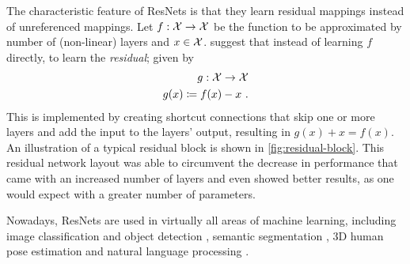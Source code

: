 The characteristic feature of ResNets is that they learn residual mappings instead of unreferenced mappings.
Let $f: \mathcal{X} \rightarrow \mathcal{X}$ be the function to be approximated by number of (non-linear) layers and $x \in \mathcal{X}$.
\citet{he16} suggest that instead of learning $f$ directly, to learn the \emph{residual}; given by
\begin{equation}
	\begin{split}
		g: \mathcal{X} \rightarrow \mathcal{X} \\
		g(x) \coloneqq f(x) - x \ .
	\end{split}
\end{equation}
This is implemented by creating shortcut connections that skip one or more layers and add the input to the layers' output, resulting in $g(x) + x = f(x)$.
An illustration of a typical residual block is shown in \cref{fig:residual-block}.
This residual network layout was able to circumvent the decrease in performance that came with an increased number of layers and even showed better results, as one would expect with a greater number of parameters.



Nowadays, ResNets are used in virtually all areas of machine learning, including image classification and object detection \cite{he16}, semantic segmentation \cite{chen17}, 3D human pose estimation \cite{drover18} and natural language processing \cite{keskar19,conneau16}.
